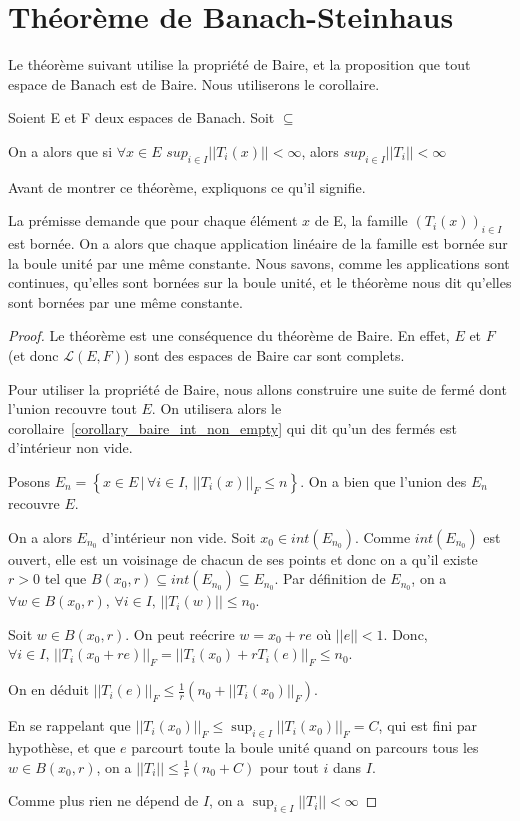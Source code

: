 \chapter{Théorème de Banach-Steinhaus}

Le théorème suivant utilise la propriété de Baire, et la proposition que tout
espace de Banach est de Baire. Nous utiliserons le corollaire.

\begin{theorem} 
	Soient E et F deux espaces de Banach.
	Soit  $\subseteq$ 
	\label{banach-steinhaus}

	On a alors que si $\forall x \in E$ $sup_{i \in I}||T_{i}(x)|| < \infty$,
	alors $sup_{i \in I} ||T_{i}|| < \infty$
\end{theorem}

Avant de montrer ce théorème, expliquons ce qu'il signifie.

La prémisse demande que pour chaque élément $x$ de E, la famille $(T_{i}(x))_{i
\in I}$ est bornée.
On a alors que chaque application linéaire de la famille est bornée sur la
boule unité par une même constante. Nous savons, comme les applications sont
continues, qu'elles sont bornées sur la boule unité, et le théorème nous dit
qu'elles sont bornées par une même constante.

\begin{proof}
	Le théorème est une conséquence du théorème de Baire. En effet, $E$ et $F$
	(et donc $\mathcal{L}(E, F)$) sont des espaces de Baire car sont complets.

	Pour utiliser la propriété de Baire, nous allons construire une suite de
	fermé dont l'union recouvre tout $E$. On utilisera alors le
	corollaire~\ref{corollary_baire_int_non_empty} qui dit qu'un des fermés est
	d'intérieur non vide.

	Posons $E_{n} = \left\{ x \in E \, | \, \forall i \in I, \, ||T_{i}(x)||_{F}
\leq n \right\}$. On a bien que l'union des $E_{n}$ recouvre $E$.

On a alors $E_{n_{0}}$ d'intérieur non vide. Soit $x_{0} \in int({E_{n_{0}}})$.
Comme $int({E_{n_{0}}})$ est ouvert, elle est un voisinage de chacun de ses
points et donc on a qu'il existe $r > 0$ tel que $B(x_{0}, r)
\subseteq int({E_{n_{0}}}) \subseteq E_{n_{0}}$. Par définition de $E_{n_{0}}$,
on a $\forall w \in B(x_{0}, r), \, \forall i \in I, \, ||T_{i}(w)|| \leq n_{0}$.

	Soit $w \in B(x_{0}, r)$. On peut reécrire $w = x_{0} + r e$ où $||e|| <
	1$. Donc, $\forall i \in I, \, ||T_{i}(x_{0} + re)||_{F} = ||T_{i}(x_{0}) +
	rT_{i}(e)||_{F} \leq n_{0}$. 

	On en déduit $||T_{i}(e)||_{F} \leq \displaystyle \frac{1}{r} (n_{0} +
	||T_{i}(x_{0})||_{F})$.

	En se rappelant que $||T_{i}(x_{0})||_{F} \leq \sup_{i \in I}
	||T_{i}(x_{0})||_{F} = C$, qui est fini par hypothèse, et que $e$ parcourt toute
	la boule unité quand on parcours tous les $w \in B(x_{0}, r)$, on a
	$||T_{i}|| \leq \displaystyle \frac{1}{r} (n_{0} + C)$ pour tout $i$ dans
	$I$.

	Comme plus rien ne dépend de $I$, on a $\sup_{i \in I}||T_{i}|| < \infty$ 
\end{proof}

